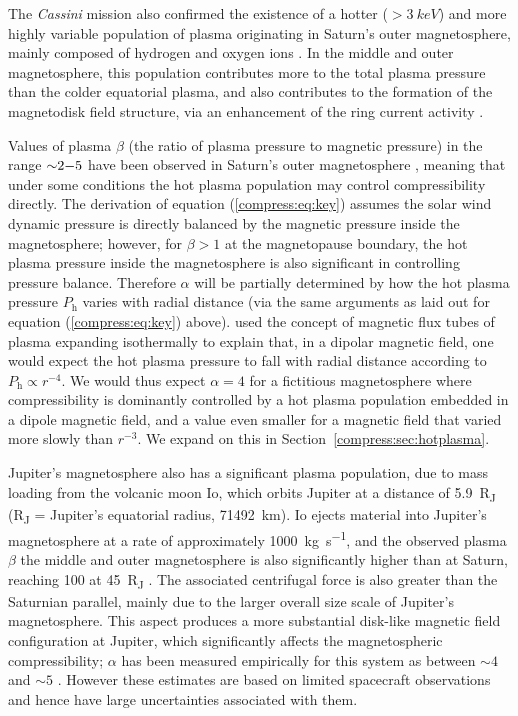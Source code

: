 The \textit{Cassini} mission also confirmed the existence of a hotter ($> \SI{3}{keV}$) and more highly variable population of plasma originating in Saturn's outer magnetosphere, mainly composed of hydrogen and oxygen ions \cite[e.g.][]{sergis2009}. In the middle and outer magnetosphere, this population contributes more to the total plasma pressure than the colder equatorial plasma, and also contributes to the formation of the magnetodisk field structure, via an enhancement of the ring current activity \cite[e.g.][]{sergis2010}. 

Values of plasma $\beta$ (the ratio of plasma pressure to magnetic pressure) in the range ${\sim}2{\--}5$ have been observed in Saturn's outer magnetosphere \citep{sergis2010}, meaning that under some conditions the hot plasma population may control compressibility directly. The derivation of equation (\ref{compress:eq:key}) assumes the solar wind dynamic pressure is directly balanced by the magnetic pressure inside the magnetosphere; however, for $\beta > 1$ at the magnetopause boundary, the hot plasma pressure inside the magnetosphere is also significant in controlling pressure balance. Therefore $\alpha$ will be partially determined by how the hot plasma pressure $P_\mathrm{h}$ varies with radial distance (via the same arguments as laid out for equation (\ref{compress:eq:key}) above). \citet{gold1959} used the concept of magnetic flux tubes of plasma expanding isothermally to explain that, in a dipolar magnetic field, one would expect the hot plasma pressure to fall with radial distance according to $P_\mathrm{h} \propto r^{-4}$. We would thus expect $\alpha = 4$ for a fictitious magnetosphere where compressibility is dominantly controlled by a hot plasma population embedded in a dipole magnetic field, and a value even smaller for a magnetic field that varied more slowly than $r^{-3}$. We expand on this in Section~\ref{compress:sec:hotplasma}.

Jupiter's magnetosphere also has a significant plasma population, due to mass loading from the volcanic moon Io, which orbits Jupiter at a distance of \SI{5.9}{R_J} (\si{R_J} = Jupiter's equatorial radius, \SI{71492}{km}). Io ejects material into Jupiter's magnetosphere at a rate of approximately \SI{1000}{kg s^{-1}}, and the observed plasma $\beta$ the middle and outer magnetosphere is also significantly higher than at Saturn, reaching 100 at \SI{45}{R_J} \citep{mauk2004}. The associated centrifugal force is also greater than the Saturnian parallel, mainly due to the larger overall size scale of Jupiter's magnetosphere. This aspect produces a more substantial disk-like magnetic field configuration at Jupiter, which significantly affects the magnetospheric compressibility; $\alpha$ has been measured empirically for this system as between ${\sim}4$ and ${\sim}5$ \citep{huddleston1998, joy2002, alexeev2005}. However these estimates are based on limited spacecraft observations and hence have large uncertainties associated with them.

